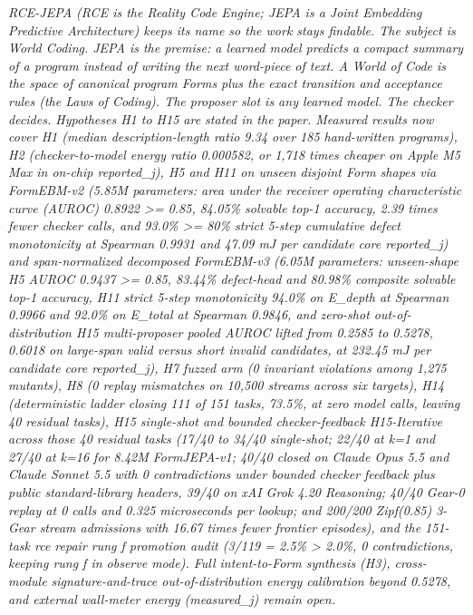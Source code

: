 \documentclass[10pt,letterpaper]{article}
\begin{document}
\vspace{6pt}
\hspace{8pt}%
\parbox{\dimexpr\linewidth-11pt\relax}{%
  \small\itshape\color{openieSlate}%
  RCE-JEPA (RCE is the Reality Code Engine; JEPA is a Joint Embedding Predictive Architecture) keeps its name so the work stays findable. The subject is World Coding. JEPA is the premise: a learned model predicts a compact summary of a program instead of writing the next word-piece of text. A World of Code is the space of canonical program Forms plus the exact transition and acceptance rules (the Laws of Coding). The proposer slot is any learned model. The checker decides. Hypotheses H1 to H15 are stated in the paper. Measured results now cover H1 (median description-length ratio 9.34 over 185 hand-written programs), H2 (checker-to-model energy ratio 0.000582, or 1,718 times cheaper on Apple M5 Max in on-chip reported\_j), H5 and H11 on unseen disjoint Form shapes via FormEBM-v2 (5.85M parameters: area under the receiver operating characteristic curve (AUROC) 0.8922 >= 0.85, 84.05\% solvable top-1 accuracy, 2.39 times fewer checker calls, and 93.0\% >= 80\% strict 5-step cumulative defect monotonicity at Spearman 0.9931 and 47.09 mJ per candidate core reported\_j) and span-normalized decomposed FormEBM-v3 (6.05M parameters: unseen-shape H5 AUROC 0.9437 >= 0.85, 83.44\% defect-head and 80.98\% composite solvable top-1 accuracy, H11 strict 5-step monotonicity 94.0\% on E\_depth at Spearman 0.9966 and 92.0\% on E\_total at Spearman 0.9846, and zero-shot out-of-distribution H15 multi-proposer pooled AUROC lifted from 0.2585 to 0.5278, 0.6018 on large-span valid versus short invalid candidates, at 232.45 mJ per candidate core reported\_j), H7 fuzzed arm (0 invariant violations among 1,275 mutants), H8 (0 replay mismatches on 10,500 streams across six targets), H14 (deterministic ladder closing 111 of 151 tasks, 73.5\%, at zero model calls, leaving 40 residual tasks), H15 single-shot and bounded checker-feedback H15-Iterative across those 40 residual tasks (17/40 to 34/40 single-shot; 22/40 at k=1 and 27/40 at k=16 for 8.42M FormJEPA-v1; 40/40 closed on Claude Opus 5.5 and Claude Sonnet 5.5 with 0 contradictions under bounded checker feedback plus public standard-library headers, 39/40 on xAI Grok 4.20 Reasoning; 40/40 Gear-0 replay at 0 calls and 0.325 microseconds per lookup; and 200/200 Zipf(0.85) 3-Gear stream admissions with 16.67 times fewer frontier episodes), and the 151-task rce repair rung f promotion audit (3/119 = 2.5\% > 2.0\%, 0 contradictions, keeping rung f in observe mode). Full intent-to-Form synthesis (H3), cross-module signature-and-trace out-of-distribution energy calibration beyond 0.5278, and external wall-meter energy (measured\_j) remain open.
}
\vspace{6pt}
\end{document}
